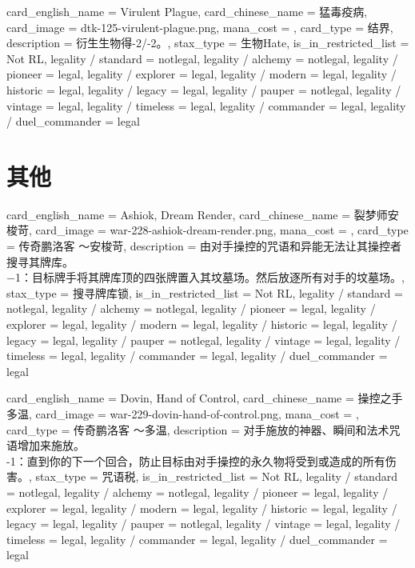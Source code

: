 \documentclass[lang = cn, color = black, 10pt]{AllThatStax}
\begin{document}
\card
{
	card_english_name = {Virulent Plague},
	card_chinese_name = {猛毒疫病},
	card_image = dtk-125-virulent-plague.png,
	mana_cost = ,
	card_type = 结界,
	description = {衍生生物得-2/-2。},
	stax_type = 生物Hate,
	is_in_restricted_list = Not RL,
	legality / standard = notlegal,
	legality / alchemy = notlegal,
	legality / pioneer = legal,
	legality / explorer = legal,
	legality / modern = legal,
	legality / historic = legal,
	legality / legacy = legal,
	legality / pauper = notlegal,
	legality / vintage = legal,
	legality / timeless = legal,
	legality / commander = legal,
	legality / duel_commander = legal
}

\section{其他}

\card
{
	card_english_name = {Ashiok, Dream Render},
	card_chinese_name = {裂梦师安梭苛},
	card_image = war-228-ashiok-dream-render.png,
	mana_cost = ,
	card_type = 传奇鹏洛客 ～安梭苛,
	description = {由对手操控的咒语和异能无法让其操控者搜寻其牌库。\\
		−1：目标牌手将其牌库顶的四张牌置入其坟墓场。然后放逐所有对手的坟墓场。},
	stax_type = 搜寻牌库锁,
	is_in_restricted_list = Not RL,
	legality / standard = notlegal,
	legality / alchemy = notlegal,
	legality / pioneer = legal,
	legality / explorer = legal,
	legality / modern = legal,
	legality / historic = legal,
	legality / legacy = legal,
	legality / pauper = notlegal,
	legality / vintage = legal,
	legality / timeless = legal,
	legality / commander = legal,
	legality / duel_commander = legal
}

\card
{
	card_english_name = {Dovin, Hand of Control},
	card_chinese_name = {操控之手多温},
	card_image = war-229-dovin-hand-of-control.png,
	mana_cost = ,
	card_type = 传奇鹏洛客 ～多温,
	description = {对手施放的神器、瞬间和法术咒语增加来施放。\\
		-1：直到你的下一个回合，防止目标由对手操控的永久物将受到或造成的所有伤害。},
	stax_type = 咒语税,
	is_in_restricted_list = Not RL,
	legality / standard = notlegal,
	legality / alchemy = notlegal,
	legality / pioneer = legal,
	legality / explorer = legal,
	legality / modern = legal,
	legality / historic = legal,
	legality / legacy = legal,
	legality / pauper = notlegal,
	legality / vintage = legal,
	legality / timeless = legal,
	legality / commander = legal,
	legality / duel_commander = legal
}
\end{document}
